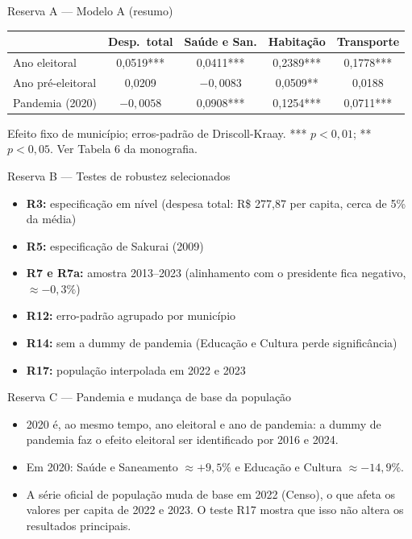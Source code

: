 \documentclass[aspectratio=169,9pt]{beamer}
\begin{document}
\begin{frame}{Reserva A --- Modelo A (resumo)}
  \begin{center}
    \small
    \begin{tabular}{lcccc}
      \toprule
       & \textbf{Desp.\ total} & \textbf{Saúde e San.} & \textbf{Habitação} & \textbf{Transporte}\\
      \midrule
      Ano eleitoral    & 0,0519*** & 0,0411*** & 0,2389*** & 0,1778*** \\
      Ano pré-eleitoral & 0,0209   & $-0{,}0083$ & 0,0509** & 0,0188 \\
      Pandemia (2020)  & $-0{,}0058$ & 0,0908*** & 0,1254*** & 0,0711*** \\
      \bottomrule
    \end{tabular}
  \end{center}
  {\scriptsize Efeito fixo de município; erros-padrão de Driscoll-Kraay. *** $p<0{,}01$; ** $p<0{,}05$. Ver Tabela 6 da monografia.}
\end{frame}

\begin{frame}{Reserva B --- Testes de robustez selecionados}
  \begin{itemize}
    \item \textbf{R3:} especificação em nível (despesa total: R\$ 277,87 per capita, cerca de 5\% da média)
    \item \textbf{R5:} especificação de Sakurai (2009)
    \item \textbf{R7 e R7a:} amostra 2013--2023 (alinhamento com o presidente fica negativo, $\approx -0{,}3\%$)
    \item \textbf{R12:} erro-padrão agrupado por município
    \item \textbf{R14:} sem a dummy de pandemia (Educação e Cultura perde significância)
    \item \textbf{R17:} população interpolada em 2022 e 2023
  \end{itemize}
\end{frame}

\begin{frame}{Reserva C --- Pandemia e mudança de base da população}
  \begin{itemize}
    \item 2020 é, ao mesmo tempo, ano eleitoral e ano de pandemia: a dummy de pandemia faz o efeito eleitoral ser identificado por 2016 e 2024.
    \item Em 2020: Saúde e Saneamento $\approx +9{,}5\%$ e Educação e Cultura $\approx -14{,}9\%$.
    \item A série oficial de população muda de base em 2022 (Censo), o que afeta os valores per capita de 2022 e 2023. O teste R17 mostra que isso não altera os resultados principais.
  \end{itemize}
\end{frame}
\end{document}

